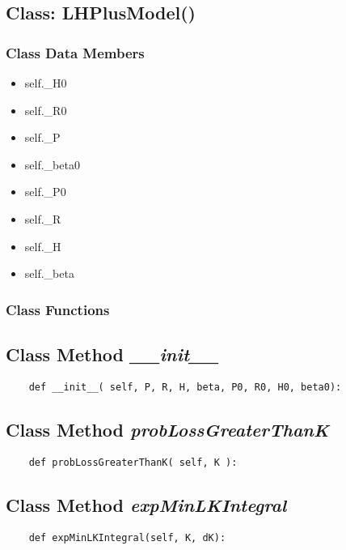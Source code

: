 \documentclass[twoside,11pt]{book}
\begin{document}
\subsection{Class: LHPlusModel()}


\subsubsection{Class Data Members}
\begin{itemize}
\item{self.\_H0}
\item{self.\_R0}
\item{self.\_P}
\item{self.\_beta0}
\item{self.\_P0}
\item{self.\_R}
\item{self.\_H}
\item{self.\_beta}
\end{itemize}

\subsubsection{Class Functions}

\subsection{Class Method {\it \_\_init\_\_}}


\begin{lstlisting}
    def __init__( self, P, R, H, beta, P0, R0, H0, beta0):
\end{lstlisting}

\subsection{Class Method {\it probLossGreaterThanK}}


\begin{lstlisting}
    def probLossGreaterThanK( self, K ):
\end{lstlisting}

\subsection{Class Method {\it expMinLKIntegral}}


\begin{lstlisting}
    def expMinLKIntegral(self, K, dK):
\end{lstlisting}
\end{document}
